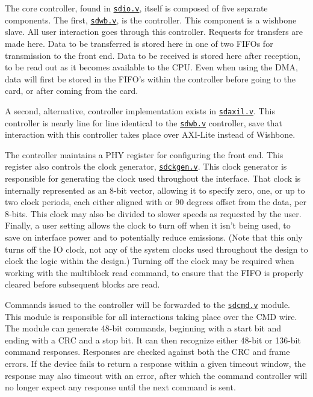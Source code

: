 \documentclass{gqtekspec}
\newcommand{\zhref}[2]{\href{#1}{\textcolor{dkblue}{#2}}}
\begin{document}
The core controller, found in \zhref{../rtl/sdio.v}{\tt sdio.v}, itself is
composed of five separate components.  The first,
\zhref{../rtl/sdwb.v}{\tt sdwb.v}, is the controller.  This component is
a wishbone slave.  All user interaction goes through this controller.
Requests for transfers are made here.  Data to be transferred is stored here
in one of two FIFOs for transmission to the front end.  Data to be received
is stored here after reception, to be read out as it becomes available to the
CPU.  Even when using the DMA, data will first be stored in the FIFO's within
the controller before going to the card, or after coming from the card.

A second, alternative, controller implementation exists in
\zhref{../rtl/sdaxil.v}{\tt sdaxil.v}.  This controller is nearly line for line
identical to the \zhref{../rtl/sdwb.v}{\tt sdwb.v} controller, save that
interaction with this controller takes place over AXI-Lite instead of Wishbone.

The controller maintains a PHY register for configuring the front end.  This
register also controls the clock generator, \zhref{../rtl/sdckgen.v}{\tt sdckgen.v}.  This clock
generator is responsible for generating the clock used throughout the
interface.  That clock is internally represented as an 8-bit vector, allowing
it to specify zero, one, or up to two clock periods, each either aligned with
or 90 degrees offset from the data, per 8-bits.  This clock may also be divided
to slower speeds as requested by the user.  Finally, a user setting allows the
clock to turn off when it isn't being used, to save on interface power and
to potentially reduce emissions.  (Note that this only turns off the IO clock,
not any of the system clocks used throughout the design to clock the logic
within the design.)  Turning off the clock may be required when working with
the multiblock read command, to ensure that the FIFO is properly cleared before
subsequent blocks are read.

Commands issued to the controller will be forwarded to the \zhref{../rtl/sdcmd.v}{\tt sdcmd.v}
module.  This module is responsible for all interactions taking place over
the CMD wire.  The module can generate 48-bit commands, beginning with a
start bit and ending with a CRC and a stop bit.  It can then recognize
either 48-bit or 136-bit command responses.  Responses are checked against
both the CRC and frame errors.  If the device fails to return a response
within a given timeout window, the response may also timeout with an error,
after which the command controller will no longer expect any response until
the next command is sent.
\end{document}
